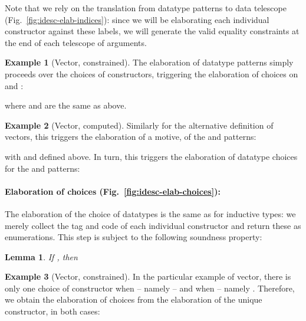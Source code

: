 \documentclass{scrartcl}
\theoremstyle{plain}
\newtheorem{lemma}{Lemma}
\theoremstyle{definition}
\newtheorem{example}{Example}
\begin{document}
Note that we rely on the translation from datatype patterns to data
telescope (Fig.~\ref{fig:idesc-elab-indices}): since we will be
elaborating each individual constructor against these labels, we will
generate the valid equality constraints at the end of each telescope
of arguments.



\begin{example}[Vector, constrained]

The elaboration of datatype patterns simply proceeds over the choices
of constructors, triggering the elaboration of choices on 
and :

where  and  are the same as above.

\end{example}



\begin{example}[Vector, computed]

Similarly for the alternative definition of vectors, this triggers the
elaboration of a motive, of the  and  patterns:

with  and  defined above.
In turn, this triggers the elaboration of datatype choices for the
 and  patterns:




\end{example}




\paragraph{Elaboration of choices (Fig.~\ref{fig:idesc-elab-choices}):}
The elaboration of the choice of datatypes is the same as for
inductive types: we merely collect the tag and code of each individual
constructor and return these as enumerations. This step is subject to
the following soundness property:
\begin{lemma}\label{lemma:idesc-elab-choices}
If 
, then


\end{lemma}



\begin{example}[Vector, constrained]

In the particular example of vector, there is only one choice of
constructor when  -- namely 
-- and when  -- namely
. Therefore, we obtain the elaboration of choices from the
elaboration of the unique constructor, in both cases:


\end{example}
\end{document}
